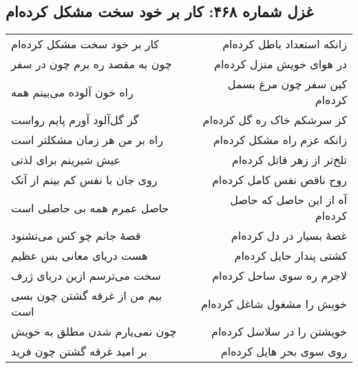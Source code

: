 \begin{center}
\section*{غزل شماره ۴۶۸: کار بر خود سخت مشکل کرده‌ام}
\label{sec:468}
\begin{longtable}{l p{0.5cm} r}
کار بر خود سخت مشکل کرده‌ام
&&
زانکه استعداد باطل کرده‌ام
\\
چون به مقصد ره برم چون در سفر
&&
در هوای خویش منزل کرده‌ام
\\
راه خون آلوده می‌بینم همه
&&
کین سفر چون مرغ بسمل کرده‌ام
\\
گر گل‌آلود آورم پایم رواست
&&
کز سرشکم خاک ره گل کرده‌ام
\\
راه بر من هر زمان مشکلتر است
&&
زانکه عزم راه مشکل کرده‌ام
\\
عیش شیرینم برای لذتی
&&
تلخ‌تر از زهر قاتل کرده‌ام
\\
روی جان با نفس کم بینم از آنک
&&
روح ناقص نفس کامل کرده‌ام
\\
حاصل عمرم همه بی حاصلی است
&&
آه از این حاصل که حاصل کرده‌ام
\\
قصهٔ جانم چو کس می‌نشنود
&&
غصهٔ بسیار در دل کرده‌ام
\\
هست دریای معانی بس عظیم
&&
کشتی پندار حایل کرده‌ام
\\
سخت می‌ترسم ازین دریای ژرف
&&
لاجرم ره سوی ساحل کرده‌ام
\\
بیم من از غرقه گشتن چون بسی است
&&
خویش را مشغول شاغل کرده‌ام
\\
چون نمی‌یارم شدن مطلق به خویش
&&
خویشتن را در سلاسل کرده‌ام
\\
بر امید غرقه گشتن چون فرید
&&
روی سوی بحر هایل کرده‌ام
\\
\end{longtable}
\end{center}
